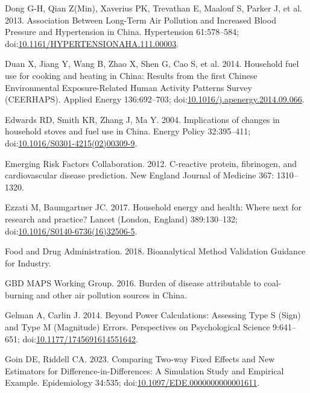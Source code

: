 \documentclass[
  letterpaper,
  DIV=11,
  numbers=noendperiod]{scrartcl}
\newlength{\cslhangindent}
\newenvironment{CSLReferences}[2] %
 {\begin{list}{}{%
  \setlength{\itemindent}{0pt}
  \setlength{\leftmargin}{0pt}
  \setlength{\parsep}{0pt}
  \ifodd #1
   \setlength{\leftmargin}{\cslhangindent}
   \setlength{\itemindent}{-1\cslhangindent}
  \fi
  \setlength{\itemsep}{#2\baselineskip}}}
 {\end{list}}
\begin{document}
\begin{CSLReferences}{1}{1}
Dong G-H, Qian Z(Min), Xaverius PK, Trevathan E, Maalouf S, Parker J, et
al. 2013. Association {Between Long-Term Air Pollution} and {Increased
Blood Pressure} and {Hypertension} in {China}. Hypertension 61:578--584;
doi:\href{https://doi.org/10.1161/HYPERTENSIONAHA.111.00003}{10.1161/HYPERTENSIONAHA.111.00003}.

Duan X, Jiang Y, Wang B, Zhao X, Shen G, Cao S, et al. 2014. Household
fuel use for cooking and heating in {China}: {Results} from the first
{Chinese Environmental Exposure-Related Human Activity Patterns Survey}
({CEERHAPS}). Applied Energy 136:692--703;
doi:\href{https://doi.org/10.1016/j.apenergy.2014.09.066}{10.1016/j.apenergy.2014.09.066}.

Edwards RD, Smith KR, Zhang J, Ma Y. 2004. Implications of changes in
household stoves and fuel use in {China}. Energy Policy 32:395--411;
doi:\href{https://doi.org/10.1016/S0301-4215(02)00309-9}{10.1016/S0301-4215(02)00309-9}.

Emerging Risk Factors Collaboration. 2012. C-reactive protein,
fibrinogen, and cardiovascular disease prediction. New England Journal
of Medicine 367: 1310--1320.

Ezzati M, Baumgartner JC. 2017. Household energy and health: Where next
for research and practice? Lancet (London, England) 389:130--132;
doi:\href{https://doi.org/10.1016/S0140-6736(16)32506-5}{10.1016/S0140-6736(16)32506-5}.

Food and Drug Administration. 2018. Bioanalytical {Method Validation
Guidance} for {Industry}.

GBD MAPS Working Group. 2016. Burden of disease attributable to
coal-burning and other air pollution sources in {China}.

Gelman A, Carlin J. 2014. Beyond {Power Calculations}: {Assessing Type
S} ({Sign}) and {Type M} ({Magnitude}) {Errors}. Perspectives on
Psychological Science 9:641--651;
doi:\href{https://doi.org/10.1177/1745691614551642}{10.1177/1745691614551642}.

Goin DE, Riddell CA. 2023. Comparing {Two-way Fixed Effects} and {New
Estimators} for {Difference-in-Differences}: {A Simulation Study} and
{Empirical Example}. Epidemiology 34:535;
doi:\href{https://doi.org/10.1097/EDE.0000000000001611}{10.1097/EDE.0000000000001611}.


\end{CSLReferences}
\end{document}
